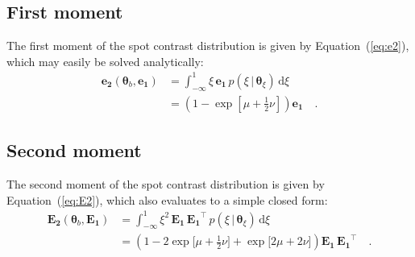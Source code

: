 \documentclass[modern]{aastex62}
\begin{document}
\subsection{First moment}
\label{sec:contrast-mom1}
The first moment of the spot contrast distribution is given by
Equation~(\ref{eq:e2}), which may easily be solved analytically:
%
\begin{align}
    \mathbf{e_2}(\pmb{\theta}_b, \mathbf{e_1})
     & =
    \int_{-\infty}^1
    \xi \,
    \mathbf{e_1} \,
    p(\xi \, \big| \, \pmb{\theta}_{\xi}) \,
    \mathrm{d}\xi
    \nonumber
    \\
     & =
    \left(1 - \exp\left[ \mu + \frac{1}{2}\nu\right]\right) \mathbf{e_1}
    \quad.
\end{align}
%

\subsection{Second moment}
\label{sec:contrast-mom2}
The second moment of the spot contrast distribution is given by
Equation~(\ref{eq:E2}), which also evaluates to a simple closed form:
%
\begin{align}
    \mathbf{E_2}(\pmb{\theta}_b, \mathbf{E_1})
     & =
    \int_{-\infty}^1
    \xi^2 \,
    \mathbf{E_1} \,
    \mathbf{E_1}^\top \,
    p(\xi \, \big| \, \pmb{\theta}_{\xi}) \,
    \mathrm{d}\xi
    \nonumber
    \\
     & =
    \left(1 - 2\exp\bigg[ \mu + \frac{1}{2}\nu\bigg]
    + \exp\bigg[ 2\mu + 2\nu\bigg]\right)
    \mathbf{E_1} \,
    \mathbf{E_1}^\top
    \quad.
\end{align}




\end{document}
